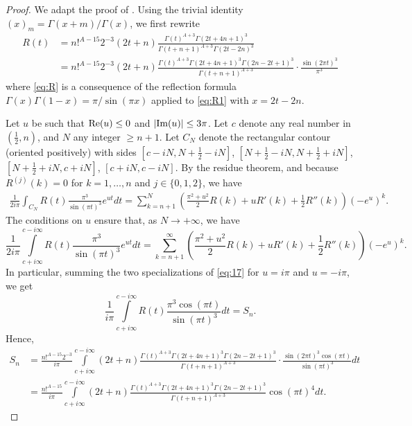 \documentclass[reqno,12pt]{article}
\theoremstyle{remark}
\begin{document}
\begin{proof} We adapt the proof of \cite[Lemma 4]{ri2}. Using the trivial identity $(x)_m=\Gamma(x+m)/\Gamma(x)$, we first rewrite
\begin{align}
R(t)&=n!^{A-15}2^{-3} (2t+n)\frac{\Gamma(t)^{A+3}\Gamma(2t+4n+1)^3}{\Gamma(t+n+1)^{A+3}\Gamma(2t-2n)^3} \label{eq:R1}
\\
&=n!^{A-15}2^{-3} (2t+n)\frac{\Gamma(t)^{A+3}\Gamma(2t+4n+1)^3\Gamma(2n-2t+1)^3}{\Gamma(t+n+1)^{A+3}}\cdot\frac{\sin(2\pi t)^3}{\pi^3}\label{eq:R}
\end{align}
where \eqref{eq:R} is a consequence of the reflection formula $\Gamma(x)\Gamma(1-x)=\pi/\sin(\pi x)$ applied to \eqref{eq:R1} with $x=2t-2n$.

Let $u$ be such that $\textup{Re}(u)\le 0$ and $\vert \textup{Im}(u)\vert\le 3\pi$. Let $c$ denote any real number in $(\frac12,n)$, and $N$ any integer $\ge n+1$. Let $C_N$ denote the rectangular contour (oriented positively) with sides $[c-iN, N+\frac12-iN]$, $[N+\frac12-iN, N+\frac12+iN]$, $[N+\frac12+iN, c+iN]$, $[c+iN,c-iN]$. 
By the residue theorem, and because $R^{(j)}(k)=0$ for $k=1, \ldots, n$ and $j\in\{0,1,2\}$, we have
\begin{align*}
\frac{1}{2i\pi}\int_{C_N} R(t) \frac{\pi^3}{\sin(\pi t)^3}e^{u t}dt=
\sum_{k=n+1}^N \left(\frac{\pi ^2+u^2}{2}R(k)+ uR'(k)+ \frac12R''(k)\right)(-e^u)^k.
\end{align*}
The conditions on $u$ ensure that, as $N\to +\infty$, we have 
\begin{equation}\label{eq:17}
\frac{1}{2i\pi}\int\limits_{c+i\infty}^{c-i\infty} R(t) \frac{\pi^3}{\sin(\pi t)^3}e^{u t}dt =
\sum_{k=n+1}^\infty \left(\frac{\pi ^2+u^2}{2}R(k)+ uR'(k)+ \frac12R''(k)\right)(-e^u)^k.
\end{equation}
In particular, summing the two specializations of \eqref{eq:17} for $u=i\pi$ and $u=-i\pi$, we get
$$
\frac{1}{i\pi}\int\limits_{c+i\infty}^{c-i\infty} R(t) \frac{\pi^3 \cos(\pi t)}{\sin(\pi t)^3}dt=S_n. 
$$
Hence, 
\begin{align*}
S_n
&=\frac{n!^{A-15}2^{-3}}{i\pi}\int\limits_{c+i\infty}^{c-i\infty} (2t+n)\frac{\Gamma(t)^{A+3}\Gamma(2t+4n+1)^3\Gamma(2n-2t+1)^3}{\Gamma(t+n+1)^{A+3}}\cdot\frac{\sin(2\pi t)^3\cos( \pi t)}{\sin(\pi t)^3} dt
\\
&=\frac{n!^{A-15}}{i\pi}\int\limits_{c+i\infty}^{c-i\infty} (2t+n)\frac{\Gamma(t)^{A+3}\Gamma(2t+4n+1)^3\Gamma(2n-2t+1)^3}{\Gamma(t+n+1)^{A+3}}\cos( \pi t)^4 dt.
\end{align*}


\end{proof}
\end{document}
